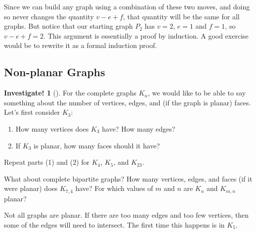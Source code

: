 \documentclass[12pt,]{book}
\theoremstyle{plain}
\theoremstyle{definition}
\theoremstyle{definition}
\theoremstyle{definition}
\newtheorem{investigation}[project]{Investigate!}
\numberwithin{equation}{chapter}
\begin{document}
\par
\hypertarget{p-1635}{}%
Since we can build any graph using a combination of these two moves, and doing so never changes the quantity \(v - e + f\), that quantity will be the same for all graphs. But notice that our starting graph \(P_2\) has \(v = 2\), \(e = 1\) and \(f = 1\), so \(v - e + f = 2\). This argument is essentially a proof by induction. A good exercise would be to rewrite it as a formal induction proof.%
\typeout{************************************************}
\typeout{************************************************}
\subsection[{Non-planar Graphs}]{Non-planar Graphs}\label{subsection-27}
\begin{investigation}[]\label{investigation-21}
\hypertarget{p-1636}{}%
For the complete graphs \(K_n\), we would like to be able to say something about the number of vertices, edges, and (if the graph is planar) faces. Let's first consider \(K_3\): %
\begin{enumerate}
\item\hypertarget{li-733}{}\hypertarget{p-1637}{}%
How many vertices does \(K_3\) have? How many edges?%
\item\hypertarget{li-734}{}\hypertarget{p-1638}{}%
If \(K_3\) is planar, how many faces should it have?%
\end{enumerate}
%
\par
\hypertarget{p-1639}{}%
Repeat parts (1) and (2) for \(K_4\), \(K_5\), and \(K_{23}\).%
\par
\hypertarget{p-1640}{}%
What about complete bipartite graphs? How many vertices, edges, and faces (if it were planar) does \(K_{7,4}\) have?  For which values of \(m\) and \(n\) are \(K_n\) and \(K_{m,n}\) planar?%
\end{investigation}
\hypertarget{p-1641}{}%
Not all graphs are planar. If there are too many edges and too few vertices, then some of the edges will need to intersect. The first time this happens is in \(K_5\).%
\end{document}
